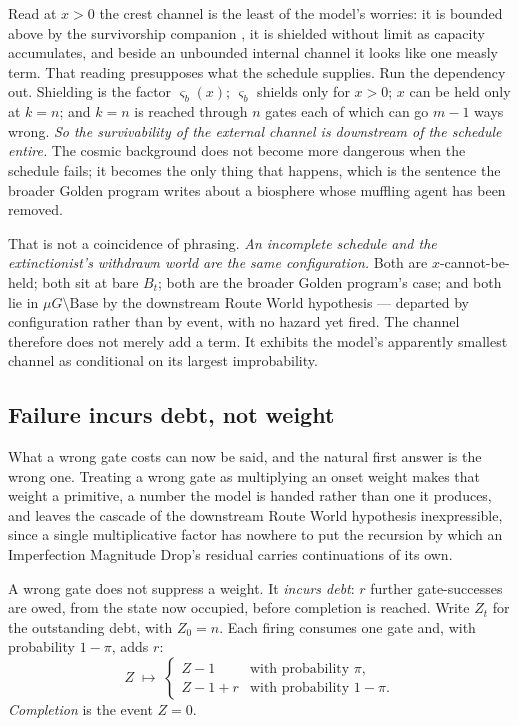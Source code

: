 \begin{remark}\label{sch:rem:reliance}
Read at $x>0$ the crest channel is the least of the model's worries: it
is bounded above by the survivorship companion \cite{GoldenSurvivorship}, it is shielded
without limit as capacity accumulates, and beside an unbounded internal
channel it looks like one measly term. That reading presupposes what the
schedule supplies. Run the dependency out. Shielding is the factor $\varsigma_b(x)$;
$\varsigma_b$ shields only for $x>0$; $x$ can be held only at $k=n$; and
$k=n$ is reached through $n$ gates each of which can go $m-1$ ways
wrong. \emph{So the survivability of the external channel is downstream
of the schedule entire.} The cosmic background does not become more
dangerous when the schedule fails; it becomes the only thing that
happens, which is the sentence the broader Golden program writes
about a biosphere whose muffling agent has been removed.

That is not a coincidence of phrasing. \emph{An incomplete schedule and
the extinctionist's withdrawn world are the same configuration.} Both
are $x$-cannot-be-held; both sit at bare $B_t$; both are
the broader Golden program's case; and both lie in
$\mu G\setminus\mathrm{Base}$ by the downstream Route World hypothesis --- departed
by configuration rather than by event, with no hazard yet fired. The
channel therefore does not merely add a term. It exhibits the model's
apparently smallest channel as conditional on its largest improbability.
\end{remark}

\subsection{Failure incurs debt, not weight}\label{sch:subsub:debt}

What a wrong gate costs can now be said, and the natural first answer is
the wrong one. Treating a wrong gate as multiplying an onset weight
makes that weight a primitive, a number the model is handed rather
than one it produces, and leaves the cascade of
the downstream Route World hypothesis inexpressible, since a single multiplicative
factor has nowhere to put the recursion by which an Imperfection
Magnitude Drop's residual carries continuations of its own.

\begin{definition}\label{sch:def:debt}
A wrong gate does not suppress a weight. It \emph{incurs debt}: $r$
further gate-successes are owed, from the state now occupied, before
completion is reached. Write $Z_t$ for the outstanding debt, with
$Z_0=n$. Each firing consumes one gate and, with probability $1-\pi$,
adds $r$:
\begin{equation}\label{sch:eq:debt}
Z\;\longmapsto\;
\begin{cases}
Z-1 & \text{with probability }\pi,\\
Z-1+r & \text{with probability }1-\pi .
\end{cases}
\end{equation}
\emph{Completion} is the event $Z=0$.
\end{definition}

